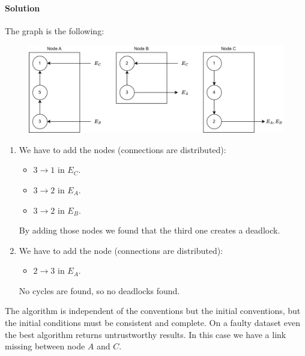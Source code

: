 \paragraph*{Solution}
The graph is the following: 
\begin{figure}[H]
    \centering
    \includegraphics[width=0.75\linewidth]{images/Ob4.png}
\end{figure}
\begin{enumerate}
    \item We have to add the nodes (connections are distributed): 
        \begin{itemize}
            \item $3 \rightarrow 1$ in $E_C$. 
            \item $3 \rightarrow 2$ in $E_A$. 
            \item $3 \rightarrow 2$ in $E_B$. 
        \end{itemize}
        By adding those nodes we found that the third one creates a deadlock. 
    \item We have to add the node (connections are distributed): 
        \begin{itemize}
            \item $2 \rightarrow 3$ in $E_A$. 
        \end{itemize}
        No cycles are found, so no deadlocks found. 
\end{enumerate}
The algorithm is independent of the conventions but the initial conventions, but the initial conditions must be consistent and complete. 
On a faulty dataset even the best algorithm returns untrustworthy results. 
In this case we have a link missing between node $A$ and $C$.